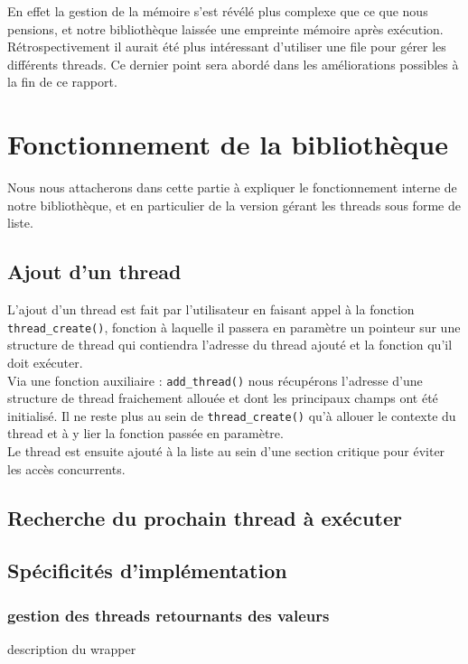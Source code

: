 \documentclass{article}
\begin{document}
			En effet la gestion de la mémoire s'est révélé plus
            complexe que ce que nous pensions, et notre bibliothèque
            laissée une empreinte mémoire après exécution.
            Rétrospectivement il aurait été plus intéressant
            d'utiliser une file pour gérer les différents threads. Ce
            dernier point sera abordé dans les améliorations possibles
            à la fin de ce rapport.
			

	\section{Fonctionnement de la bibliothèque}
	Nous nous attacherons dans cette partie à expliquer le
    fonctionnement interne de notre bibliothèque, et en particulier
     de la version gérant les threads sous forme de
    liste.

		\subsection{Ajout d'un thread}
		L'ajout d'un thread est fait par l'utilisateur en faisant 
		appel à la fonction \verb!thread_create()!, fonction à laquelle il
		passera en paramètre un pointeur sur une structure de thread qui 
		contiendra l'adresse du thread ajouté et la fonction qu'il doit
		exécuter.\\
		
		Via une fonction auxiliaire : \verb!add_thread()! nous récupérons
		l'adresse d'une structure de thread fraichement allouée et dont les
		principaux champs ont été initialisé. Il ne reste plus au sein de 
		\verb!thread_create()! qu'à allouer le contexte du thread et à y lier
		la fonction passée en paramètre.\\
		
		Le thread est ensuite ajouté à la liste au sein d'une section critique
		pour éviter les accès concurrents.

		\subsection{Recherche du prochain thread à exécuter}

		\subsection{Spécificités d'implémentation}
		
			\subsubsection{gestion des threads retournants des valeurs}
			description du wrapper
			
\end{document}

